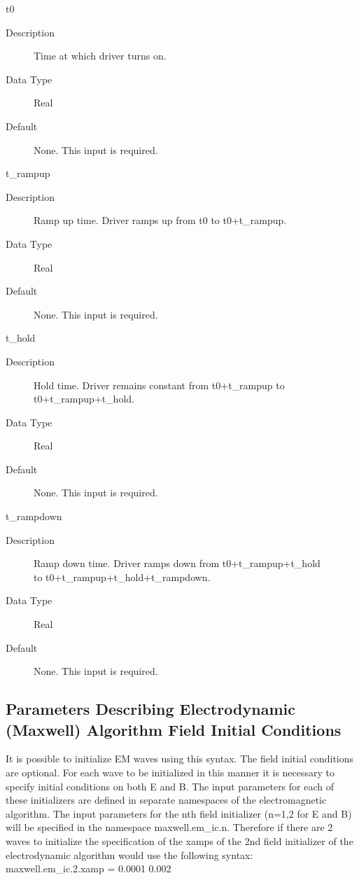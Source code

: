 \documentclass[11pt]{amsart}
\begin{document}
t0
\begin{description}
\item [Description] Time at which driver turns on.
\item [Data Type] Real
\item [Default] None.  This input is required.
\end{description}

t\_rampup
\begin{description}
\item [Description] Ramp up time.  Driver ramps up from t0 to t0+t\_rampup.
\item [Data Type] Real
\item [Default] None.  This input is required.
\end{description}

t\_hold
\begin{description}
\item [Description] Hold time.  Driver remains constant from t0+t\_rampup to \\
t0+t\_rampup+t\_hold.
\item [Data Type] Real
\item [Default] None.  This input is required.
\end{description}

t\_rampdown
\begin{description}
\item [Description] Ramp down time.  Driver ramps down from t0+t\_rampup+t\_hold \\
to t0+t\_rampup+t\_hold+t\_rampdown.
\item [Data Type] Real
\item [Default] None.  This input is required.
\end{description}

\subsection*{Parameters Describing Electrodynamic (Maxwell) Algorithm  Field Initial Conditions }
It is possible to initialize EM waves using this syntax.  The field initial
conditions are optional.  For each wave to be initialized in this manner it is
necessary to specify initial conditions on both E and B.  The input parameters
for each of these initializers are defined in separate namespaces of the
electromagnetic algorithm.  The input parameters for the nth field initializer
(n=1,2 for E and B) will be specified in the namespace maxwell.em\_ic.n.
Therefore if there are 2 waves to initialize the specification of the xamps of
the 2nd field initializer of the electrodynamic algorithm would use the
following syntax: \\
maxwell.em\_ic.2.xamp = 0.0001 0.002
\end{document}
